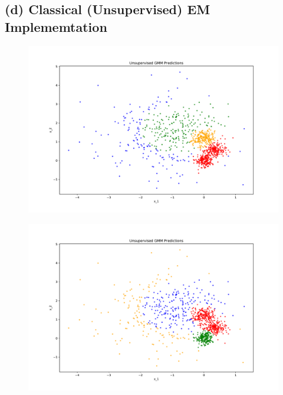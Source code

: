 \documentclass[11pt]{article}
\begin{document}
	\subsection{(d) Classical (Unsupervised) EM Implememtation}
	\begin{figure}[H]
		\centering
		\includegraphics[width=\linewidth]{src/semi_supervised_em/pred_0.pdf}
	\end{figure}
	\begin{figure}[H]
		\centering
		\includegraphics[width=\linewidth]{src/semi_supervised_em/pred_1.pdf}
	\end{figure}
	
\end{document}
